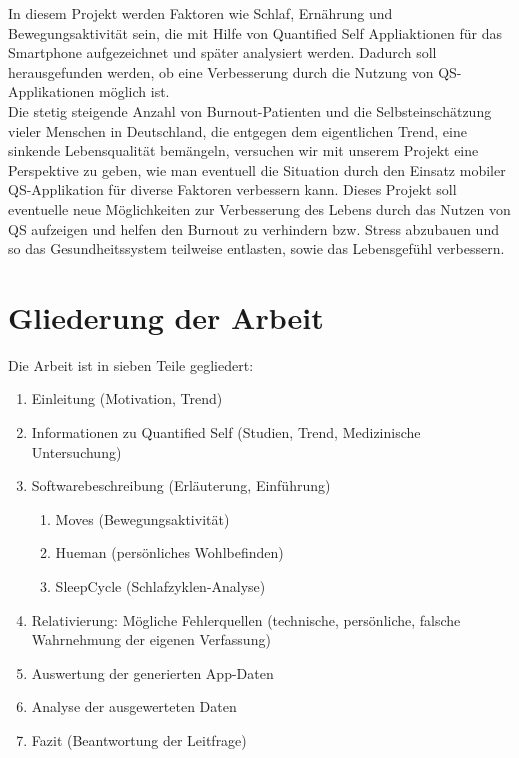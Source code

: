 In diesem Projekt werden Faktoren wie Schlaf, Ernährung und Bewegungsaktivität sein, die mit Hilfe von Quantified Self Appliaktionen für das Smartphone aufgezeichnet und später analysiert werden. %
Dadurch soll herausgefunden werden, ob eine Verbesserung durch die Nutzung von QS-Applikationen möglich ist. \\
Die stetig steigende Anzahl von Burnout-Patienten und die Selbsteinschätzung vieler Menschen in Deutschland, die entgegen dem eigentlichen Trend, eine sinkende Lebensqualität bemängeln, versuchen wir mit unserem Projekt eine Perspektive zu geben, wie man eventuell die Situation durch den Einsatz mobiler QS-Applikation für diverse Faktoren verbessern kann. 
Dieses Projekt soll eventuelle neue Möglichkeiten zur Verbesserung des Lebens durch das Nutzen von QS aufzeigen und helfen den Burnout zu verhindern bzw. Stress abzubauen und so das Gesundheitssystem teilweise entlasten, sowie das Lebensgefühl verbessern. 

\section{Gliederung der Arbeit}
\label{ch:Einleitung:sec:gliederung-der-arbeit}

Die Arbeit ist in sieben Teile gegliedert:

\begin{enumerate}
\def\labelenumi{\arabic{enumi}.}
\itemsep1pt\parskip0pt
\item
  Einleitung (Motivation, Trend)
\item
  Informationen zu Quantified Self (Studien, Trend, Medizinische
  Untersuchung)
\item
  Softwarebeschreibung (Erläuterung, Einführung)

  \begin{enumerate}
  \def\labelenumii{\alph{enumii}.}
  \itemsep1pt\parskip0pt
  \item
    Moves (Bewegungsaktivität)\\
  \item
    Hueman (persönliches Wohlbefinden)\\
  \item
    SleepCycle (Schlafzyklen-Analyse)
  \end{enumerate}
\item
  Relativierung: Mögliche Fehlerquellen (technische, persönliche,
  falsche Wahrnehmung der eigenen Verfassung)
\item
  Auswertung der generierten App-Daten
\item
  Analyse der ausgewerteten Daten
\item
  Fazit (Beantwortung der Leitfrage)
\end{enumerate}

